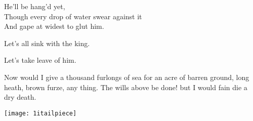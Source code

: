
\begin{verse_speech}[Gonzalo] He'll be hang'd yet,\\
Though every drop of water swear against it\\
And gape at widest to glut him.
\end{verse_speech}



\begin{verse_speech}[Antonio] Let's all sink with the king.\end{verse_speech}

\begin{verse_speech}[Sebastian] Let's take leave of him.\end{verse_speech}


\begin{prose_speech}[Gonzalo] Now would I give a thousand furlongs of sea for an
acre of barren ground, long heath, brown furze, any
 thing. The wills above be done! but I would fain
die a dry death.
\end{prose_speech}

\exeunt{}

\vfill

\begin{center}
\texttt{[image: 1itailpiece]}
\end{center}

